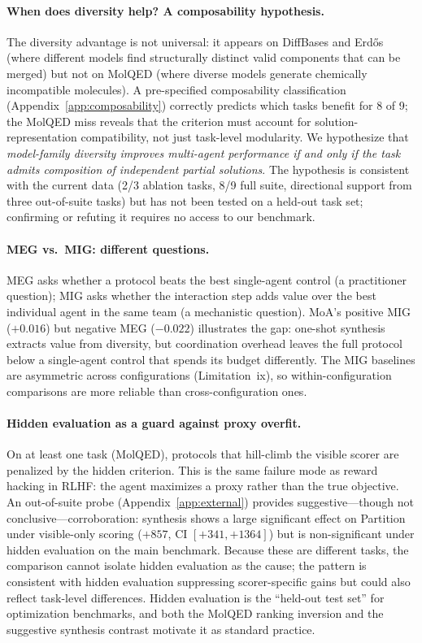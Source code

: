 \documentclass{article}
\begin{document}
\paragraph{When does diversity help? A composability hypothesis.}
The diversity advantage is not universal: it appears on DiffBases and Erd\H{o}s (where different models find structurally distinct valid components that can be merged) but not on MolQED (where diverse models generate chemically incompatible molecules). A pre-specified composability classification (Appendix~\ref{app:composability}) correctly predicts which tasks benefit for 8 of 9; the MolQED miss reveals that the criterion must account for solution-representation compatibility, not just task-level modularity. We hypothesize that \emph{model-family diversity improves multi-agent performance if and only if the task admits composition of independent partial solutions}. The hypothesis is consistent with the current data (2/3 ablation tasks, 8/9 full suite, directional support from three out-of-suite tasks) but has not been tested on a held-out task set; confirming or refuting it requires no access to our benchmark.

\paragraph{MEG vs.\ MIG: different questions.}
MEG asks whether a protocol beats the best single-agent control (a practitioner question); MIG asks whether the interaction step adds value over the best individual agent in the same team (a mechanistic question). MoA's positive MIG ($+0.016$) but negative MEG ($-0.022$) illustrates the gap: one-shot synthesis extracts value from diversity, but coordination overhead leaves the full protocol below a single-agent control that spends its budget differently. The MIG baselines are asymmetric across configurations (Limitation~ix), so within-configuration comparisons are more reliable than cross-configuration ones.

\paragraph{Hidden evaluation as a guard against proxy overfit.}
On at least one task (MolQED), protocols that hill-climb the visible scorer are penalized by the hidden criterion. This is the same failure mode as reward hacking in RLHF: the agent maximizes a proxy rather than the true objective. An out-of-suite probe (Appendix~\ref{app:external}) provides suggestive---though not conclusive---corroboration: synthesis shows a large significant effect on Partition under visible-only scoring ($+857$, CI $[+341, +1364]$) but is non-significant under hidden evaluation on the main benchmark. Because these are different tasks, the comparison cannot isolate hidden evaluation as the cause; the pattern is consistent with hidden evaluation suppressing scorer-specific gains but could also reflect task-level differences. Hidden evaluation is the ``held-out test set'' for optimization benchmarks, and both the MolQED ranking inversion and the suggestive synthesis contrast motivate it as standard practice.
\end{document}
